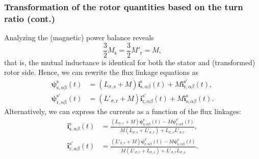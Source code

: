 \begin{frame}
	\frametitle{Transformation of the rotor quantities based on the turn ratio (cont.)}
    Analyzing the (magnetic) power balance reveals
    \begin{equation}
        \frac{3}{2}M_\mathrm{s} = \frac{3}{2}M'_\mathrm{r} = M, 
    \end{equation}
    that is, the mutual inductance is identical for both the stator and (transformed) rotor side. Hence, we can rewrite the flux linkage equations as
    \begin{align}
        \bm{\psi}^\mathrm{s}_\mathrm{s,\alpha\beta}(t) &= (L_{\sigma,\mathrm{s}} +M) \bm{i}^\mathrm{s}_{\mathrm{s},\alpha\beta}(t) +  M\bm{i}^{\mathrm{s}'}_{\mathrm{r},\alpha\beta}(t),\\
        \bm{\psi}^{\mathrm{s}'}_\mathrm{r,\alpha\beta}(t) &= (L'_{\sigma,\mathrm{r}} + M) \bm{i}^{\mathrm{s}'}_{\mathrm{r},\alpha\beta}(t) +  M \bm{i}^\mathrm{s}_{\mathrm{s},\alpha\beta}(t).
    \end{align}
    Alternatively, we can express the currents as a function of the flux linkages:
    \begin{align}
        \bm{i}^\mathrm{s}_{\mathrm{s},\alpha\beta}(t) &= \frac{(L_{\sigma,s}+M)\bm{\psi}^\mathrm{s}_\mathrm{s,\alpha\beta}(t)- M \bm{\psi}^\mathrm{s'}_\mathrm{r,\alpha\beta}(t)}{M(L_{\sigma,s}+L'_{\sigma,r}) + L_{\sigma,s}L'_{\sigma,r}},\\
        \bm{i}^{\mathrm{s}'}_{\mathrm{r},\alpha\beta}(t) &= \frac{(L'_{\sigma,r}+M)\bm{\psi}^{\mathrm{s}'}_\mathrm{r,\alpha\beta}(t)- M \bm{\psi}^{\mathrm{s}}_\mathrm{s,\alpha\beta}(t)}{M(L'_{\sigma,r}+L_{\sigma,s}) + L'_{\sigma,r}L_{\sigma,s}}.
    \end{align}
\end{frame}

